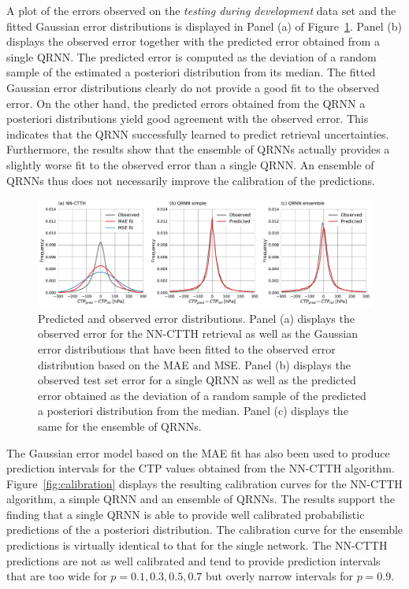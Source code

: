 \documentclass[journal abbreviation, manuscript]{copernicus}
\begin{document}
A plot of the errors observed on the \textit{testing during development} data set
and the fitted Gaussian error distributions is displayed in Panel (a) of
Figure~\ref{fig:error_fit}. Panel (b) displays the observed error
together with the predicted error obtained from a single QRNN. The predicted
error is computed as the deviation of a random sample of the estimated a posteriori
distribution from its median. The fitted Gaussian error distributions clearly do
not provide a good fit to the observed error. On the other hand, the predicted
 errors obtained from the QRNN a posteriori distributions yield good agreement with
the observed error. This indicates that the QRNN successfully learned to predict
retrieval uncertainties. Furthermore, the results show that the ensemble of
QRNNs actually provides a slightly worse fit to the observed error than a single
QRNN. An ensemble of QRNNs thus does not necessarily improve the calibration of
the predictions.

  \begin{figure}[hbpt!]
    \centering
    \includegraphics[width = 1.0\linewidth]{../plots/fig09.pdf}
    \caption{Predicted and observed error distributions. Panel (a)
      displays the observed error for the NN-CTTH retrieval as well as the
      Gaussian error distributions that have been fitted to the observed
      error distribution based on the MAE and MSE. Panel (b)
      displays the observed test set error for a single QRNN as well as the
      predicted error obtained as the deviation of a random sample of the
      predicted a posteriori distribution from the median. Panel (c) displays
      the same for the ensemble of QRNNs.}
    \label{fig:error_fit}
  \end{figure}

The Gaussian error model based on the MAE fit has also been used to produce
prediction intervals for the CTP values obtained from the NN-CTTH algorithm.
Figure~\ref{fig:calibration} displays the resulting calibration curves for the
NN-CTTH algorithm, a simple QRNN and an ensemble of QRNNs. The results
support the finding that a single QRNN is able to provide well calibrated
probabilistic predictions of the a posteriori distribution. The calibration
curve for the ensemble predictions is virtually identical to that for the single
network. The NN-CTTH predictions are not as well calibrated and tend to provide
prediction intervals that are too wide for $p = 0.1, 0.3, 0.5, 0.7$ but
overly narrow intervals for $p = 0.9$.
\end{document}
